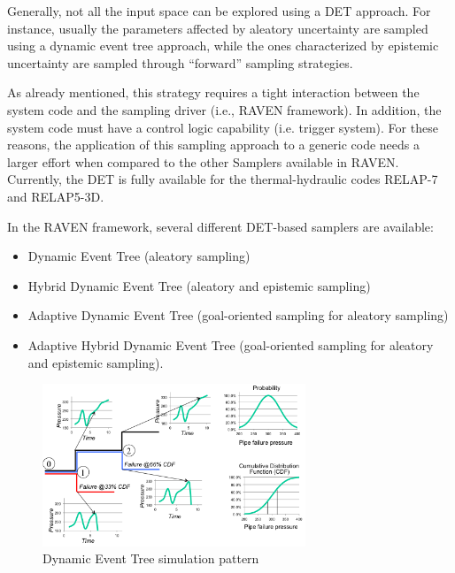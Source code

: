 Generally, not all the input space can be explored using a DET approach. For instance, usually the parameters affected by aleatory uncertainty are sampled using a dynamic event tree approach, while the ones characterized by epistemic uncertainty are sampled through ``forward'' sampling strategies. 

As already mentioned, this strategy requires a tight interaction between the system code and the sampling driver (i.e., RAVEN framework). In addition, the system code must have a control logic capability (i.e. trigger system). For these reasons, the application of this sampling approach to a generic code needs a larger effort when compared to the other Samplers available in RAVEN. Currently, the DET is fully available for the thermal-hydraulic codes RELAP-7 and RELAP5-3D.

In the RAVEN framework, several different DET-based samplers are available:
\begin{itemize}
\item Dynamic Event Tree (aleatory sampling)
\item Hybrid Dynamic Event Tree (aleatory and epistemic sampling)
\item Adaptive Dynamic Event Tree (goal-oriented sampling for aleatory sampling)
\item Adaptive Hybrid Dynamic Event Tree (goal-oriented sampling for aleatory and epistemic sampling).
\end{itemize}

\begin{figure}
  \centering
  \includegraphics[width=0.7\textwidth]  {pics/DETscheme.png}
  \caption{Dynamic Event Tree simulation pattern}
  \label{fig:DETschemeExample}
\end{figure}

